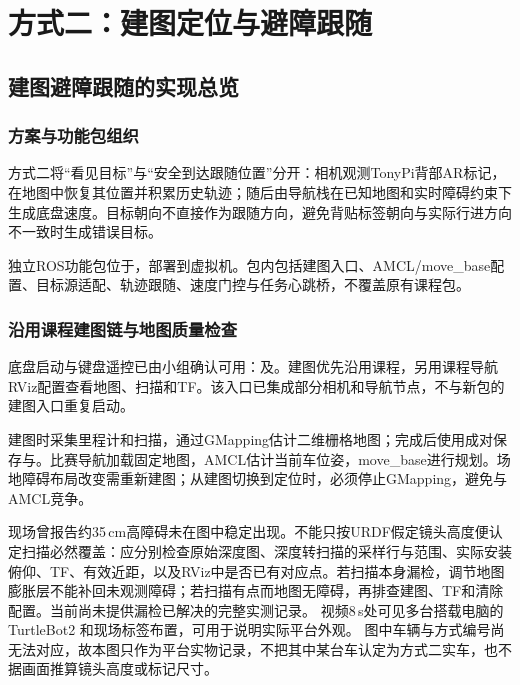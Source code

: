\section{方式二：建图定位与避障跟随}
\subsection{建图避障跟随的实现总览}
\subsubsection{方案与功能包组织}
方式二将“看见目标”与“安全到达跟随位置”分开：相机观测TonyPi背部AR标记，在地图中恢复其位置并积累历史轨迹；随后由导航栈在已知地图和实时障碍约束下生成底盘速度。目标朝向不直接作为跟随方向，避免背贴标签朝向与实际行进方向不一致时生成错误目标。

独立ROS功能包位于，部署到虚拟机。包内包括建图入口、AMCL/move\_base配置、目标源适配、轨迹跟随、速度门控与任务心跳桥，不覆盖原有课程包。

\subsubsection{沿用课程建图链与地图质量检查}
底盘启动与键盘遥控已由小组确认可用：及。建图优先沿用课程，另用课程导航RViz配置查看地图、扫描和TF。该入口已集成部分相机和导航节点，不与新包的建图入口重复启动。

建图时采集里程计和扫描，通过GMapping估计二维栅格地图；完成后使用成对保存与。比赛导航加载固定地图，AMCL估计当前车位姿，move\_base进行规划。场地障碍布局改变需重新建图；从建图切换到定位时，必须停止GMapping，避免与AMCL竞争。

现场曾报告约35\,cm高障碍未在图中稳定出现。不能只按URDF假定镜头高度便认定扫描必然覆盖：应分别检查原始深度图、深度转扫描的采样行与范围、实际安装俯仰、TF、有效近距，以及RViz中是否已有对应点。若扫描本身漏检，调节地图膨胀层不能补回未观测障碍；若扫描有点而地图无障碍，再排查建图、TF和清除配置。当前尚未提供漏检已解决的完整实测记录。
视频8\,s处可见多台搭载电脑的 TurtleBot2 和现场标签布置，可用于说明实际平台外观。
图中车辆与方式编号尚无法对应，故本图只作为平台实物记录，不把其中某台车认定为方式二实车，也不据画面推算镜头高度或标记尺寸。

